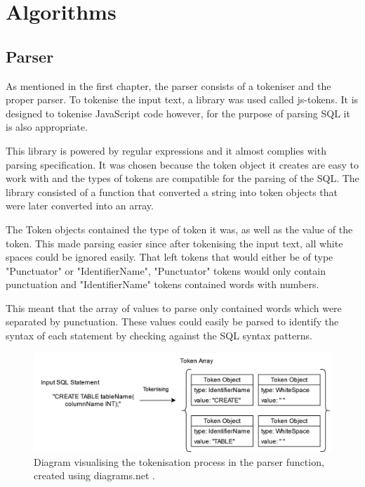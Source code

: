 \newpage

\section{Algorithms}

\subsection{Parser}

As mentioned in the first chapter, the parser consists of a tokeniser and the proper parser. To tokenise the input text, a library was used called js-tokens\cite{tokeniser}. It is designed to tokenise JavaScript code however, for the purpose of parsing SQL it is also appropriate. 

This library is powered by regular expressions and it almost complies with parsing specification. It was chosen because the token object it creates are easy to work with and the types of tokens are compatible for the parsing of the SQL. The library consisted of a function that converted a string into token objects that were later converted into an array. 

The Token objects contained the type of token it was, as well as the value of the token. This made parsing easier since after tokenising the input text, all white spaces could be ignored easily. That left tokens that would either be of type "Punctuator" or "IdentifierName", "Punctuator" tokens would only contain punctuation and "IdentifierName" tokens contained words with numbers. 

This meant that the array of values to parse only contained words which were separated by punctuation. These values could easily be parsed to identify the syntax of each statement by checking against the SQL syntax patterns.

\begin{figure}[h!]
	\centering
	\includegraphics[width = \textwidth]{tokenisingDiagram}
	\caption{Diagram visualising the tokenisation process in the parser function, created using diagrams.net \cite{dbdiagram}.}
	\label{fig:tokenisingDiagram}
\end{figure}


